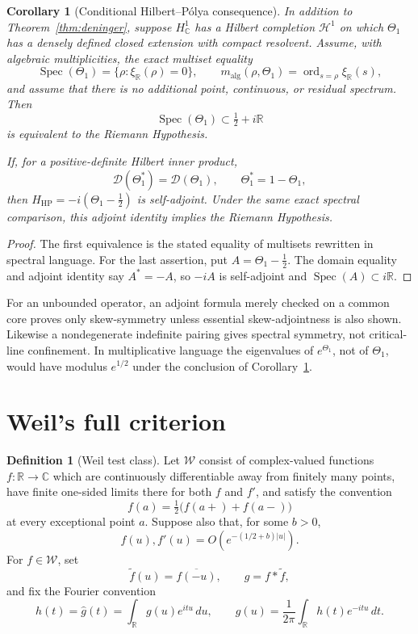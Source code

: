 \documentclass[11pt]{article}
\theoremstyle{plain}
\newtheorem{corollary}[theorem]{Corollary}
\theoremstyle{definition}
\newtheorem{definition}[theorem]{Definition}
\theoremstyle{remark}
\begin{document}
\begin{corollary}[Conditional Hilbert--P\'olya consequence]
\label{cor:hp}
In addition to Theorem~\ref{thm:deninger}, suppose \(H^1_{\mathbb C}\) has a
Hilbert completion \(\mathscr H^1\) on which \(\Theta_1\) has a densely
defined closed extension with compact resolvent.  Assume, with algebraic
multiplicities, the exact multiset equality
\[
 \operatorname{Spec}(\Theta_1)
 =\{\rho:\xi_{\mathbb R}(\rho)=0\},
 \qquad
 m_{\mathrm{alg}}(\rho,\Theta_1)
 =\operatorname{ord}_{s=\rho}\xi_{\mathbb R}(s),
\]
and assume that there is no additional point, continuous, or residual
spectrum.  Then
\[
 \operatorname{Spec}(\Theta_1)\subset\tfrac12+i\mathbb R
\]
is equivalent to the Riemann Hypothesis.

If, for a positive-definite Hilbert inner product,
\[
 \mathcal D(\Theta_1^*)=\mathcal D(\Theta_1),
 \qquad \Theta_1^*=1-\Theta_1,
\]
then \(H_{\mathrm{HP}}=-i(\Theta_1-\tfrac12)\) is self-adjoint.  Under the
same exact spectral comparison, this adjoint identity implies the Riemann
Hypothesis.
\end{corollary}

\begin{proof}
The first equivalence is the stated equality of multisets rewritten in
spectral language.  For the last assertion, put
\(A=\Theta_1-\tfrac12\).  The domain equality and adjoint identity say
\(A^*=-A\), so \(-iA\) is self-adjoint and
\(\operatorname{Spec}(A)\subset i\mathbb R\).
\end{proof}

For an unbounded operator, an adjoint formula merely checked on a common
core proves only skew-symmetry unless essential skew-adjointness is also
shown.  Likewise a nondegenerate indefinite pairing gives spectral symmetry,
not critical-line confinement.  In multiplicative language the eigenvalues
of \(e^{\Theta_1}\), not of \(\Theta_1\), would have modulus
\(e^{1/2}\) under the conclusion of Corollary~\ref{cor:hp}.

\section{Weil's full criterion}

\begin{definition}[Weil test class]
\label{def:weil-class}
Let \(\mathcal W\) consist of complex-valued functions
\(f:\mathbb R\to\mathbb C\) which are continuously differentiable away
from finitely many points, have finite one-sided limits there for both
\(f\) and \(f'\), and satisfy the convention
\[
 f(a)=\tfrac12\bigl(f(a+)+f(a-)\bigr)
\]
at every exceptional point \(a\).  Suppose also that, for some \(b>0\),
\[
 f(u),f'(u)=O(e^{-(1/2+b)|u|}).
\]
For \(f\in\mathcal W\), set
\[
 \widetilde f(u)=\overline{f(-u)},\qquad g=f*\widetilde f,
\]
and fix the Fourier convention
\[
 h(t)=\widehat g(t)=\int_{\mathbb R}g(u)e^{itu}\,du,
 \qquad
 g(u)=\frac1{2\pi}\int_{\mathbb R}h(t)e^{-itu}\,dt.
\]
\end{definition}
\end{document}
